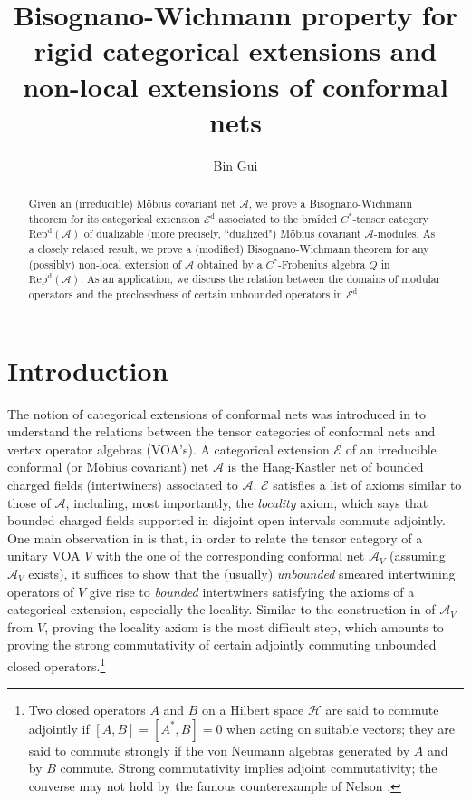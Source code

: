 \documentclass[12pt,a4paper]{article}
\title{Bisognano-Wichmann property for rigid categorical extensions and non-local extensions of conformal nets}
\author{{\sc Bin Gui}%
}
\date{}
\theoremstyle{definition}
\theoremstyle{plain}
\newcommand{\mc}{\mathcal}
\newcommand{\scr}{\mathscr}
\newcommand{\RepdA}{\mathrm{Rep}^{\mathrm d}(\mc A)}
\newcommand{\Ed}{\mathscr E^{\mathrm d}}
\numberwithin{equation}{section}
\begin{document}
\sloppy %
	\setcounter{section}{-1}
	
	\maketitle


\begin{abstract}
Given an (irreducible) M\"obius covariant net $\mc A$, we prove a Bisognano-Wichmann  theorem  for its categorical extension $\Ed$ associated to the braided $C^*$-tensor category $\RepdA$ of dualizable (more precisely, ``dualized") M\"obius covariant $\mc A$-modules. As a closely related result, we prove a (modified) Bisognano-Wichmann theorem  for any (possibly) non-local extension of $\mc A$ obtained by a $C^*$-Frobenius algebra $Q$ in $\RepdA$.  As an application, we discuss the relation between the domains of modular operators and the preclosedness of certain unbounded operators in $\Ed$.
\end{abstract}	
	
	



	
	
	
	
	
	
\tableofcontents
	
\newpage


\section{Introduction}

The notion of categorical extensions of conformal nets was introduced in \cite{Gui21a} to understand the relations between the tensor categories of conformal nets and vertex operator algebras (VOA's). A categorical extension $\scr E$ of an irreducible conformal (or M\"obius covariant) net $\mc A$ is the Haag-Kastler net of bounded charged fields (intertwiners) associated to $\mc A$. $\scr E$ satisfies a list of axioms similar to those of $\mc A$, including, most importantly, the \emph{locality} axiom, which says that bounded charged fields supported in disjoint open intervals commute adjointly. One main observation in \cite{Gui21a} is that, in order to relate the tensor category of a unitary VOA $V$ with the one of the corresponding conformal net $\mc A_V$ (assuming $\mc A_V$ exists), it suffices to show that the (usually) \emph{unbounded} smeared intertwining operators of $V$ give rise to \emph{bounded} intertwiners satisfying the axioms of a categorical extension, especially the locality. Similar to the construction in \cite{CKLW18} of $\mc A_V$ from $V$, proving the locality axiom is the most difficult step, which amounts to proving the strong commutativity of certain adjointly commuting unbounded closed operators.\footnote{Two closed operators $A$ and $B$ on a Hilbert space $\mc H$ are said to commute adjointly if $[A,B]=[A^*,B]=0$ when acting on suitable vectors; they are said to commute strongly if the  von Neumann algebras generated by $A$ and by $B$ commute. Strong commutativity implies adjoint commutativity; the converse may not hold by the famous counterexample of Nelson \cite{Nel59}.}
\end{document}
